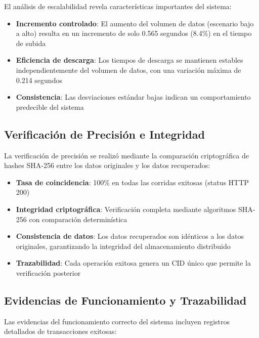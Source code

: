 \documentclass[onecolumn]{article}
\begin{document}
El análisis de escalabilidad revela características importantes del sistema:

\begin{itemize}
    \item \textbf{Incremento controlado}: El aumento del volumen de datos (escenario bajo a alto) resulta en un incremento de solo 0.565 segundos (8.4\%) en el tiempo de subida
    \item \textbf{Eficiencia de descarga}: Los tiempos de descarga se mantienen estables independientemente del volumen de datos, con una variación máxima de 0.214 segundos
    \item \textbf{Consistencia}: Las desviaciones estándar bajas indican un comportamiento predecible del sistema
\end{itemize}

\subsection{Verificación de Precisión e Integridad}

La verificación de precisión se realizó mediante la comparación criptográfica de hashes SHA-256 entre los datos originales y los datos recuperados:

\begin{itemize}
    \item \textbf{Tasa de coincidencia}: 100\% en todas las corridas exitosas (status HTTP 200)
    \item \textbf{Integridad criptográfica}: Verificación completa mediante algoritmos SHA-256 con comparación determinística
    \item \textbf{Consistencia de datos}: Los datos recuperados son idénticos a los datos originales, garantizando la integridad del almacenamiento distribuido
    \item \textbf{Trazabilidad}: Cada operación exitosa genera un CID único que permite la verificación posterior
\end{itemize}

\subsection{Evidencias de Funcionamiento y Trazabilidad}

Las evidencias del funcionamiento correcto del sistema incluyen registros detallados de transacciones exitosas:
\end{document}
